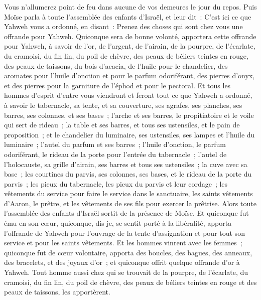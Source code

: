 \begin{multicols}{2}
Vous n'allumerez point de feu dans aucune de vos demeures le jour du repos.
Puis Moïse parla à toute l'assemblée des enfants d'Israël, et leur dit~: C'est ici ce que Yahweh vous a ordonné, en disant~:
Prenez des choses qui sont chez vous une offrande pour Yahweh. Quiconque sera de bonne volonté, apportera cette offrande pour Yahweh, à savoir de l'or, de l'argent, de l'airain,
de la pourpre, de l'écarlate, du cramoisi, du fin lin, du poil de chèvre,
des peaux de béliers teintes en rouge, des peaux de taissons, du bois d'acacia,
de l'huile pour le chandelier, des aromates pour l'huile d'onction et pour le parfum odoriférant,
des pierres d'onyx, et des pierres pour la garniture de l'éphod et pour le pectoral.
Et tous les hommes d'esprit d'entre vous viendront et feront tout ce que Yahweh a ordonné, 
à savoir le tabernacle, sa tente, et sa couverture, ses agrafes, ses planches, ses barres, ses colonnes, et ses bases~;
l'arche et ses barres, le propitiatoire et le voile qui sert de rideau~;
la table et ses barres, et tous ses ustensiles, et le pain de proposition~;
et le chandelier du luminaire, ses ustensiles, ses lampes et l'huile du luminaire~;
l'autel du parfum et ses barres~; l'huile d'onction, le parfum odoriférant, le rideau de la porte pour l'entrée du tabernacle~;
l'autel de l'holocauste, sa grille d'airain, ses barres et tous ses ustensiles~; la cuve avec sa base~;
les courtines du parvis, ses colonnes, ses bases, et le rideau de la porte du parvis~;
les pieux du tabernacle, les pieux du parvis et leur cordage~;
les vêtements du service pour faire le service dans le sanctuaire, les saints vêtements d'Aaron, le prêtre, et les vêtements de ses fils pour exercer la prêtrise.
Alors toute l'assemblée des enfants d'Israël sortit de la présence de Moïse.
Et quiconque fut ému en son cœur, quiconque, dis-je, se sentit porté à la libéralité, apporta l'offrande de Yahweh pour l'ouvrage de la tente d'assignation et pour tout son service et pour les saints vêtements.
Et les hommes vinrent avec les femmes~; quiconque fut de cœur volontaire, apporta des boucles, des bagues, des anneaux, des bracelets, et des joyaux d'or~; et quiconque offrit quelque offrande d'or à Yahweh.
Tout homme aussi chez qui se trouvait de la pourpre, de l'écarlate, du cramoisi, du fin lin, du poil de chèvre, des peaux de béliers teintes en rouge et des peaux de taissons, les apportèrent.

\end{multicols}
